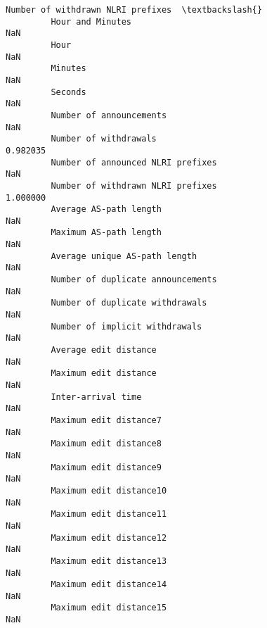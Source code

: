 \documentclass[11pt]{article}
\begin{document}
\begin{Verbatim}[commandchars=\\\{\}]
                                                            Number of withdrawn NLRI prefixes  \textbackslash{}
         Hour and Minutes                                                                 NaN   
         Hour                                                                             NaN   
         Minutes                                                                          NaN   
         Seconds                                                                          NaN   
         Number of announcements                                                          NaN   
         Number of withdrawals                                                       0.982035   
         Number of announced NLRI prefixes                                                NaN   
         Number of withdrawn NLRI prefixes                                           1.000000   
         Average AS-path length                                                           NaN   
         Maximum AS-path length                                                           NaN   
         Average unique AS-path length                                                    NaN   
         Number of duplicate announcements                                                NaN   
         Number of duplicate withdrawals                                                  NaN   
         Number of implicit withdrawals                                                   NaN   
         Average edit distance                                                            NaN   
         Maximum edit distance                                                            NaN   
         Inter-arrival time                                                               NaN   
         Maximum edit distance7                                                           NaN   
         Maximum edit distance8                                                           NaN   
         Maximum edit distance9                                                           NaN   
         Maximum edit distance10                                                          NaN   
         Maximum edit distance11                                                          NaN   
         Maximum edit distance12                                                          NaN   
         Maximum edit distance13                                                          NaN   
         Maximum edit distance14                                                          NaN   
         Maximum edit distance15                                                          NaN   

\end{Verbatim}
\end{document}
